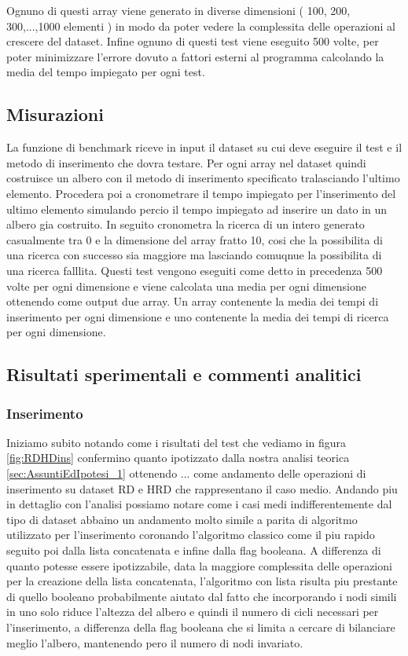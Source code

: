 Ognuno di questi array viene generato in diverse dimensioni ( 100, 200, 300,...,1000 elementi ) in modo da poter vedere la complessita delle operazioni 
al crescere del dataset.
Infine ognuno di questi test viene eseguito 500 volte, per poter minimizzare l'errore dovuto a fattori esterni al programma calcolando
la media del tempo impiegato per ogni test.

\subsection{Misurazioni}
\label{sec:Misurazioni_1}
La funzione di benchmark riceve in input il dataset su cui deve eseguire il test e il metodo di inserimento che dovra
testare. Per ogni array nel dataset quindi costruisce un albero con il metodo di inserimento specificato tralasciando l'ultimo elemento.
Procedera poi a cronometrare il tempo impiegato per l'inserimento del ultimo elemento simulando percio il tempo impiegato ad 
inserire un dato in un albero gia costruito.
In seguito cronometra la ricerca di un intero generato casualmente tra 0 e la dimensione del array fratto 10, cosi che la possibilita di una ricerca con successo
sia maggiore ma lasciando comuqnue la possibilita di una ricerca falllita.
Questi test vengono eseguiti come detto in precedenza 500 volte per ogni dimensione e viene calcolata una media per ogni dimensione ottenendo come output due array.
Un array contenente la media dei tempi di inserimento per ogni dimensione e uno contenente la media dei tempi di ricerca per ogni dimensione. 

\subsection{Risultati sperimentali e commenti analitici}
\label{sec:RisultatiSperimentaliCommentiAnalitici_1}

\subsubsection{Inserimento}
Iniziamo subito notando come i risultati del test che vediamo in figura \ref{fig:RDHDins} confermino quanto ipotizzato dalla nostra analisi teorica \ref{sec:AssuntiEdIpotesi_1}
ottenendo ... come andamento delle operazioni di inserimento su dataset RD e HRD che rappresentano il caso medio.
Andando piu in dettaglio con l'analisi possiamo notare come i casi medi indifferentemente dal tipo di dataset abbaino un andamento molto simile a parita di
algoritmo utilizzato per l'inserimento coronando l'algoritmo classico come il piu rapido seguito poi dalla lista concatenata e infine dalla flag booleana. 
A differenza di quanto potesse essere ipotizzabile, data la maggiore complessita delle operazioni per la creazione della lista concatenata, l'algoritmo con lista
risulta piu prestante di quello booleano probabilmente aiutato dal fatto che incorporando i nodi simili in uno solo riduce l'altezza del albero e quindi il numero di 
cicli necessari per l'inserimento, a differenza della flag booleana che si limita a cercare di bilanciare meglio l'albero, mantenendo pero il numero di nodi invariato.


